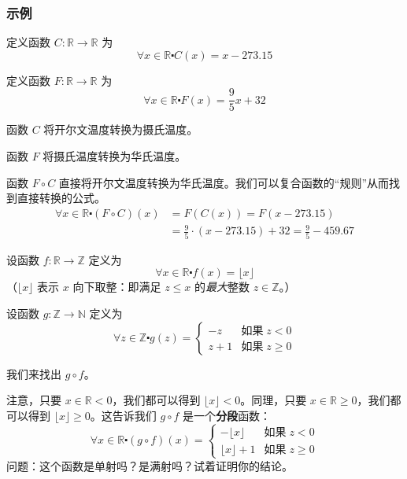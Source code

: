 \subsubsection*{示例}

\begin{example}
    定义函数 $ C : \mathbb{R} \to \mathbb{R}$ 为
    \[\forall x \in \mathbb{R} \centerdot C(x) = x - 273.15\]

    定义函数 $ F : \mathbb{R} \to \mathbb{R}$ 为
    \[\forall x \in \mathbb{R} \centerdot F(x) = \frac{9}{5}x + 32\]

    函数 $C$ 将开尔文温度转换为摄氏温度。

    函数 $F$ 将摄氏温度转换为华氏温度。

    函数 $F \circ C$ 直接将开尔文温度转换为华氏温度。我们可以复合函数的``规则''从而找到直接转换的公式。
    \begin{align*}
        \forall x \in \mathbb{R} \centerdot (F \circ C)(x) &= F(C(x)) = F(x - 273.15) \\
        &= \frac{9}{5} \cdot (x - 273.15) + 32 = \frac{9}{5}-459.67
    \end{align*}
\end{example}

\begin{example}
    设函数 $f : \mathbb{R} \to \mathbb{Z}$ 定义为
    \[\forall x \in \mathbb{R} \centerdot f(x) = \lfloor x \rfloor\]
    （$\lfloor x \rfloor$ 表示 $x$ 向下取整：即满足 $z \le x$ 的\emph{最大}整数 $z \in \mathbb{Z}$。）

    设函数 $g : \mathbb{Z} \to \mathbb{N}$ 定义为
    \[\forall z \in \mathbb{Z} \centerdot g(z) = \begin{cases}
        -z & \text{如果}\;z<0 \\
        z+1 & \text{如果}\;z \ge 0
    \end{cases}\]

    我们来找出 $g \circ f$。

    注意，只要 $x \in \mathbb{R} < 0$，我们都可以得到 $\lfloor x \rfloor < 0$。同理，只要 $x \in \mathbb{R} \ge 0$，我们都可以得到 $\lfloor x \rfloor \ge 0$。这告诉我们 $g \circ f$ 是一个\textbf{分段}函数：
    \[\forall x \in \mathbb{R} \centerdot (g \circ f)(x) = \begin{cases}
        -\lfloor x \rfloor & \text{如果}\;z<0 \\
        \lfloor x \rfloor+1 & \text{如果}\;z \ge 0
    \end{cases}\]
    问题：这个函数是单射吗？是满射吗？试着证明你的结论。
\end{example}


